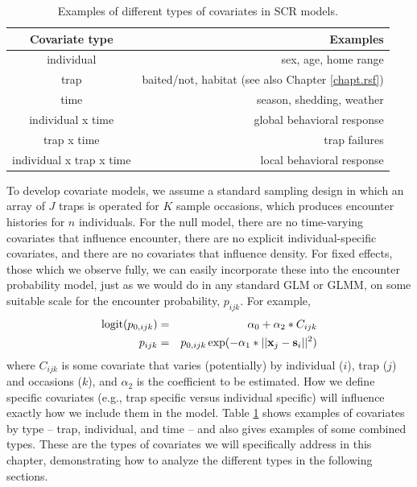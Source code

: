 \begin{table}[ht]
\centering
\caption{Examples of different types of covariates in SCR models.}
\begin{tabular}{cr}
\hline \hline
Covariate type & Examples \\
\hline
individual & sex, age, home range \\
trap  &  baited/not, habitat (see also Chapter \ref{chapt.rsf}) \\
time  &  season, shedding,  weather  \\
individual x time    &    global behavioral response \\
trap x time     &       trap failures  \\ 
individual x trap x time  &   local behavioral response  \\ \hline
\end{tabular}
\label{covariates.tab.covclass}
\end{table}


To develop covariate models, we assume a standard sampling design in which an
array of $J$ traps is operated for $K$ sample occasions, which produces
encounter histories for $n$ individuals.  For the null model, there
are no time-varying covariates that influence encounter, there are no
explicit individual-specific covariates, and there are no covariates
that influence density.  For fixed effects, those which we observe
fully, we can easily incorporate these into the encounter probability
model, just as we would do in any standard GLM or GLMM, on some
suitable scale for the encounter probability, $p_{ijk}$. For example,
\begin{eqnarray*}
\mbox{logit}(p_{0,ijk}) &=& \alpha_0 + \alpha_2*C_{ijk} \\
p_{ijk} &=& p_{0,ijk} \exp(- \alpha_1*||{\bf x}_{j}-{\bf s}_{i}||^2) 
\end{eqnarray*}
where $C_{ijk}$ is some covariate that varies (potentially) by
individual ($i$), trap ($j$) and occasions ($k$), and
$\alpha_2$ is the coefficient to be estimated.
 How we define specific covariates (e.g., trap specific
versus individual specific) will influence exactly how we include them
in the model. Table \ref{covariates.tab.covclass} shows examples of covariates by
type -- trap, individual, and time -- and also gives examples of some combined types.
These are the types of covariates we will specifically address in this chapter, demonstrating
how to analyze the different
 types in the following sections.  

